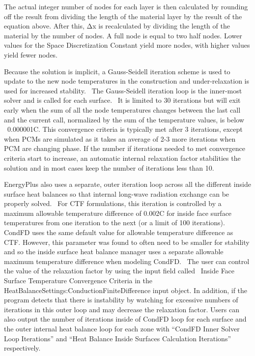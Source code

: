 The actual integer number of nodes for each layer is then calculated by rounding off the result from dividing the length of the material layer by the result of the equation above. After this, Δx is recalculated by dividing the length of the material by the number of nodes. A full node is equal to two half nodes. Lower values for the Space Discretization Constant yield more nodes, with higher values yield fewer nodes.

Because the solution is implicit, a Gauss-Seidell iteration scheme is used to update to the new node temperatures in the construction and under-relaxation is used for increased stability.~ The Gauss-Seidell iteration loop is the inner-most solver and is called for each surface.~ It is limited to 30 iterations but will exit early when the sum of all the node temperatures changes between the last call and the current call, normalized by the sum of the temperature values, is below ~0.000001C. This convergence criteria is typically met after 3 iterations, except when PCMs are simulated as it takes an average of 2-3 more iterations when PCM are changing phase. If the number if iterations needed to met convergence criteria start to increase, an automatic internal relaxation factor stabilities the solution and in most cases keep the number of iterations less than 10.

EnergyPlus also uses a separate, outer iteration loop across all the different inside surface heat balances so that internal long-wave radiation exchange can be properly solved.~ For CTF formulations, this iteration is controlled by a maximum allowable temperature difference of 0.002C for inside face surface temperatures from one iteration to the next (or a limit of 100 iterations). CondFD uses the same default value for allowable temperature difference as CTF. However, this parameter was found to often need to be smaller for stability and so the inside surface heat balance manager uses a separate allowable maximum temperature difference when modeling CondFD.~ The user can control the value of the relaxation factor by using the input field called~ Inside Face Surface Temperature Convergence Criteria in the HeatBalanceSettings:ConductionFiniteDifference input object. In addition, if the program detects that there is instability by watching for excessive numbers of iterations in this outer loop and may decrease the relaxation factor. Users can also output the number of iterations inside of CondFD loop for each surface and the outer internal heat balance loop for each zone with ``CondFD Inner Solver Loop Iterations'' and ``Heat Balance Inside Surfaces Calculation Iterations'' respectively.

